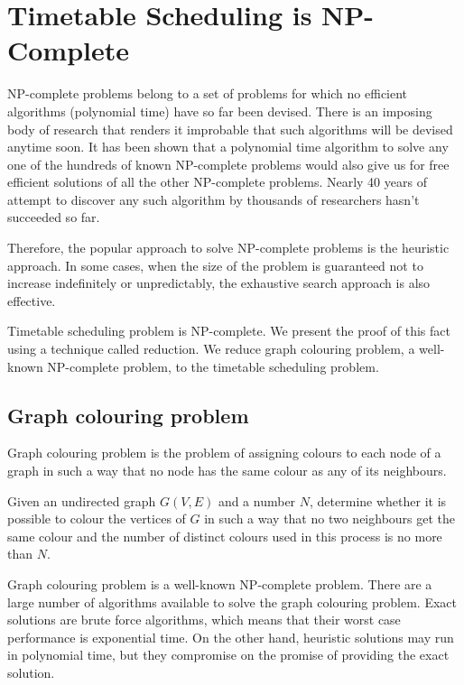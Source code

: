 \documentclass[11pt,a4paper]{article}
\begin{document}
\section{Timetable Scheduling is NP-Complete}
NP-complete problems belong to a set of problems for which no efficient algorithms (polynomial time) have so far been devised. There is an imposing body of research that renders it improbable that such algorithms will be devised anytime soon. It has been shown that a polynomial time algorithm to solve any one of the hundreds of known NP-complete problems would also give us for free efficient solutions of all the other NP-complete problems. Nearly 40 years of attempt to discover any such algorithm by thousands of researchers hasn’t succeeded so far.

Therefore, the popular approach to solve NP-complete problems is the heuristic approach. In some cases, when the size of the problem is guaranteed not to increase indefinitely or unpredictably, the exhaustive search approach is also effective.

Timetable scheduling problem is NP-complete. We present the proof of this fact using a technique called reduction. We reduce graph colouring problem, a well-known NP-complete problem, to the timetable scheduling problem.

\subsection{Graph colouring problem}
Graph colouring problem is the problem of assigning colours to each node of a graph in such a way that no node has the same colour as any of its neighbours.

\begin{mydef}
Given an undirected graph $G(V, E)$ and a number $N$, determine whether it is possible to colour the vertices of $G$ in such a way that no two neighbours get the same colour and the number of distinct colours used in this process is no more than $N$.
\end{mydef}

Graph colouring problem is a well-known NP-complete problem. There are a large number of algorithms available to solve the graph colouring problem. Exact solutions are brute force algorithms, which means that their worst case performance is exponential time. On the other hand, heuristic solutions may run in polynomial time, but they compromise on the promise of providing the exact solution.
\end{document}

